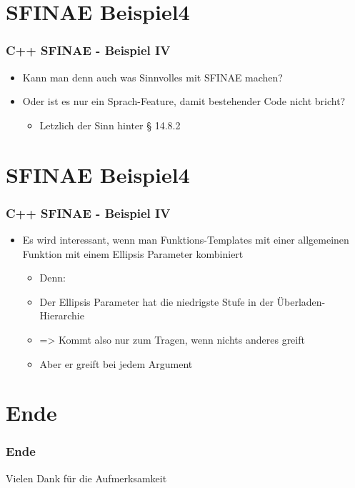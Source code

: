 \documentclass{beamer}
\begin{document}
\section{SFINAE Beispiel4}
\begin{frame}[fragile]
\frametitle{C++ SFINAE - Beispiel IV}

\begin{itemize}
\item Kann man denn auch was Sinnvolles mit SFINAE machen?
\item Oder ist es nur ein Sprach-Feature, damit bestehender Code nicht bricht?
\begin{itemize}
\item Letzlich der Sinn hinter § 14.8.2
\end{itemize}

\end{itemize}
\end{frame}



\section{SFINAE Beispiel4}
\begin{frame}[fragile]
\frametitle{C++ SFINAE - Beispiel IV}

\begin{itemize}
\item Es wird interessant, wenn man Funktions-Templates mit einer allgemeinen Funktion mit einem Ellipsis Parameter kombiniert
\begin{itemize}
\item Denn: 
\item Der Ellipsis Parameter hat die niedrigste Stufe in der Überladen-Hierarchie
\item => Kommt also nur zum Tragen, wenn nichts anderes greift
\item Aber er greift bei jedem Argument
\end{itemize}

\end{itemize}
\end{frame}


\section{Ende}
\begin{frame}
\frametitle{Ende}

Vielen Dank für die Aufmerksamkeit

\end{frame}
\end{document}
